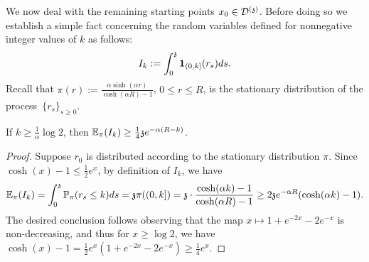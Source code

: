 We now deal with the remaining starting points $x_0\in\dt$.
Before doing so we establish a simple fact concerning the random variables defined for nonnegative integer values of $k$ as follows:
\begin{equation}\label{mixedLower:def:Ik}
I_k := \int_0^\ss {\bf 1}_{(0,k]}(r_s)ds.
\end{equation}
Recall that $\pi(r):=\frac{\alpha\sinh(\alpha r)}{\cosh(\alpha R)-1}$, $0\leq r\leq R$, is the stationary distribution of the process~$\{r_s\}_{s\geq 0}$.
\begin{fact}\label{fact:stationary}
If $k\geq\frac{1}{\alpha}\log 2$, 
then $\EE_{\pi}(I_k) \ge \tfrac14\ss e^{-\alpha (R-k)}$.
\end{fact}
\begin{proof}
Suppose $r_0$  is distributed according to the stationary distribution $\pi$. 
Since $\cosh(x)-1\leq \frac12 e^x$, by definition of $I_k$, we have
\[
\EE_{\pi}(I_k) = \int_0^{\ss}\PP_{\pi}(r_s\leq k)ds =\ss\pi((0,k]) = \ss\cdot\frac{\cosh(\alpha k)-1}{\cosh(\alpha R)-1}
\geq 2\ss e^{-\alpha R}(\cosh(\alpha k)-1).
\]
The desired conclusion follows observing that the map $x\mapsto 1+e^{-2x}-2e^{-x}$ is non-decreasing, and thus for $x\geq\log 2$, we have 
$\cosh(x)-1=\frac12 e^x(1+e^{-2x}-2e^{-x})\geq\frac14 e^{x}$.
\end{proof}

